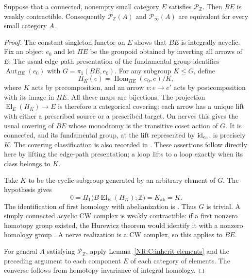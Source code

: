 \begin{nrlemma}\label{NR:C:cyclic-covers}
Suppose that a connected, nonempty small category $E$ satisfies $\mathcal P_{\mathbb Z}$. Then $BE$ is weakly contractible. Consequently $\mathcal P_{\mathbb Z}(A)$ and $\mathcal P_\infty(A)$ are equivalent for every small category $A$.
\end{nrlemma}
\begin{proof}
The constant singleton functor on $E$ shows that $BE$ is integrally acyclic. Fix an object $e_0$ and let $\Pi E$ be the groupoid obtained by inverting all arrows of $E$. The usual edge-path presentation of the fundamental group identifies $\operatorname{Aut}_{\Pi E}(e_0)$ with $G=\pi_1(BE,e_0)$. For any subgroup $K\leq G$, define
\[
 H_K(e)=\operatorname{Hom}_{\Pi E}(e_0,e)/K,
\]
where $K$ acts by precomposition, and an arrow $v:e\to e'$ acts by postcomposition with its image in $\Pi E$. All these maps are bijections. The projection $\operatorname{El}_E(H_K)\to E$ is therefore a categorical covering: each arrow has a unique lift with either a prescribed source or a prescribed target. On nerves this gives the usual covering of $BE$ whose monodromy is the transitive coset action of $G$. It is connected, and its fundamental group, at the lift represented by $\operatorname{id}_{e_0}$, is precisely $K$. The covering classification is also recorded in \citet[Theorem~1.38]{Hatcher2002}. These assertions follow directly here by lifting the edge-path presentation; a loop lifts to a loop exactly when its class belongs to $K$.

Take $K$ to be the cyclic subgroup generated by an arbitrary element of $G$. The hypothesis gives
\[
 0=H_1\bigl(B\operatorname{El}_E(H_K);\mathbb Z\bigr)
   =K_{\mathrm{ab}}=K.
\]
The identification of first homology with abelianization is \citet[Theorem~2A.1]{Hatcher2002}. Thus $G$ is trivial. A simply connected acyclic CW complex is weakly contractible: if a first nonzero homotopy group existed, the Hurewicz theorem would identify it with a nonzero homology group \citep[Theorem~4.32]{Hatcher2002}. A nerve realization is a CW complex, so this applies to $BE$.

For general $A$ satisfying $\mathcal P_{\mathbb Z}$, apply Lemma~\ref{NR:C:inherit-elements} and the preceding argument to each component $E$ of each category of elements. The converse follows from homotopy invariance of integral homology.
\end{proof}

